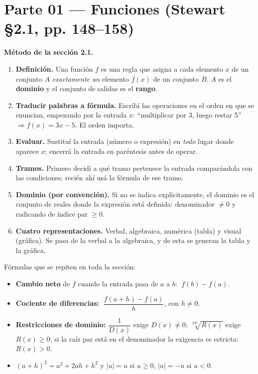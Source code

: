 \documentclass[11pt]{article}
\begin{document}
\shorthandoff{<>}  %

\section*{Parte 01 — Funciones (Stewart §2.1, pp. 148--158)}

\begin{teo}
\textbf{Método de la sección 2.1.}
\begin{enumerate}[leftmargin=*]
\item \textbf{Definición.} Una función $f$ es una regla que asigna a cada elemento $x$ de un conjunto $A$ \emph{exactamente un} elemento $f(x)$ de un conjunto $B$. $A$ es el \textbf{dominio} y el conjunto de salidas es el \textbf{rango}.
\item \textbf{Traducir palabras a fórmula.} Escribí las operaciones en el orden en que se enuncian, empezando por la entrada $x$: ``multiplicar por 3, luego restar 5'' $\Rightarrow f(x)=3x-5$. El orden importa.
\item \textbf{Evaluar.} Sustituí la entrada (número o expresión) en \emph{todo} lugar donde aparece $x$; encerrá la entrada en paréntesis antes de operar.
\item \textbf{Tramos.} Primero decidí a qué tramo pertenece la entrada comparándola con las condiciones; recién ahí usá la fórmula de ese tramo.
\item \textbf{Dominio (por convención).} Si no se indica explícitamente, el dominio es el conjunto de reales donde la expresión está definida: denominador $\ne 0$ y radicando de índice par $\ge 0$.
\item \textbf{Cuatro representaciones.} Verbal, algebraica, numérica (tabla) y visual (gráfica). Se pasa de la verbal a la algebraica, y de esta se generan la tabla y la gráfica.
\end{enumerate}
\end{teo}

\begin{tip}
Fórmulas que se repiten en toda la sección:
\begin{itemize}[leftmargin=*]
\item \textbf{Cambio neto} de $f$ cuando la entrada pasa de $a$ a $b$: $\;f(b)-f(a)$.
\item \textbf{Cociente de diferencias:} $\;\dfrac{f(a+h)-f(a)}{h}$, con $h\ne 0$.
\item \textbf{Restricciones de dominio:} $\dfrac{1}{D(x)}$ exige $D(x)\ne0$; $\sqrt[\,\text{par}\,]{R(x)}$ exige $R(x)\ge 0$; si la raíz par está en el denominador la exigencia es estricta: $R(x)>0$.
\item $(a+h)^2=a^2+2ah+h^2$ y $|u|=u$ si $u\ge0$, $|u|=-u$ si $u<0$.
\end{itemize}
\end{tip}
\end{document}
